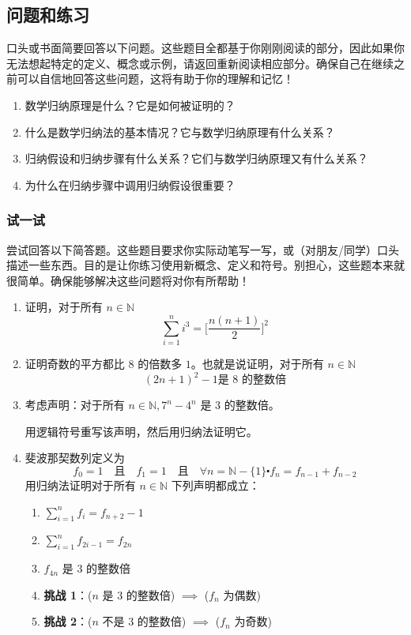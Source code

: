 \subsection{问题和练习}

口头或书面简要回答以下问题。这些题目全都基于你刚刚阅读的部分，因此如果你无法想起特定的定义、概念或示例，请返回重新阅读相应部分。确保自己在继续之前可以自信地回答这些问题，这将有助于你的理解和记忆！

\begin{enumerate}[label=(\arabic*)]
    \item 数学归纳原理是什么？它是如何被证明的？
    \item 什么是数学归纳法的基本情况？它与数学归纳原理有什么关系？
    \item 归纳假设和归纳步骤有什么关系？它们与数学归纳原理又有什么关系？
    \item 为什么在归纳步骤中调用归纳假设很重要？
\end{enumerate}

\subsubsection*{试一试}

尝试回答以下简答题。这些题目要求你实际动笔写一写，或（对朋友/同学）口头描述一些东西。目的是让你练习使用新概念、定义和符号。别担心，这些题本来就很简单。确保能够解决这些问题将对你有所帮助！

\begin{enumerate}[label=(\arabic*)]
    \item 证明，对于所有 $n \in \mathbb{N}$
        \[\sum_{i=1}^{n} i^3 = \bigg[\frac{n(n+1)}{2}\bigg]^2\]
    \item 证明奇数的平方都比 $8$ 的倍数多 $1$。也就是说证明，对于所有 $n \in \mathbb{N}$
        \[(2n+1)^2-1 \text{是 8 的整数倍}\]
    \item 考虑声明：对于所有 $n \in \mathbb{N}, 7^n-4^n$ 是 $3$ 的整数倍。
    
    用逻辑符号重写该声明，然后用归纳法证明它。
    \item 斐波那契数列定义为
    \[f_0=1 \quad\text{且}\quad f_1=1 \quad\text{且}\quad \forall n=\mathbb{N}-\{1\} \centerdot f_n=f_{n-1}+f_{n-2}\]
    用归纳法证明对于所有 $n \in \mathbb{N}$ 下列声明都成立：
    \begin{enumerate}[label=(\alph*)]
        \item $\displaystyle\sum_{i=1}^{n} f_i = f_{n+2}-1$
        \item $\displaystyle\sum_{i=1}^{n} f_{2i-1} = f_{2n}$
        \item $f_{4n}$ 是 $3$ 的整数倍
        \item \textbf{挑战 1}：($n$ 是 $3$ 的整数倍) $\implies$ ($f_n$ 为偶数)
        \item \textbf{挑战 2}：($n$ 不是 $3$ 的整数倍) $\implies$ ($f_n$ 为奇数)
    \end{enumerate}
\end{enumerate}